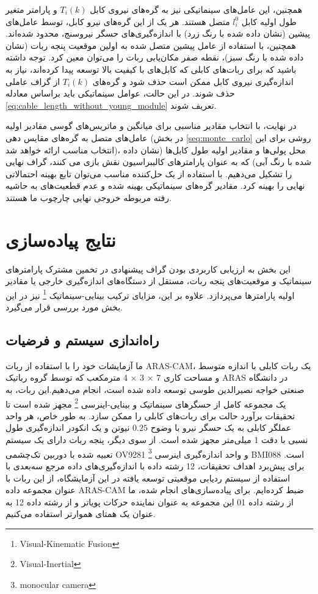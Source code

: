 همچنین، این عامل‌های سینماتیکی نیز به گره‌های نیروی کابل
$T_i(k)$
و پارامتر متغیر طول اولیه کابل
$l_{i}^0$
 متصل هستند. هر یک از این گره‌های نیرو کابل، توسط عامل‌های پیشین (نشان داده شده با رنگ زرد) با اندازه‌گیری‌های حسگر نیروسنج، محدود شده‌اند. همچنین، با استفاده از عامل پیشین متصل شده به اولین موقعیت پنجه ربات (نشان داده شده با رنگ سبز)، نقطه صفر مکان‌یابی ربات را می‌توان معین کرد. توجه داشته باشید که برای ربات‌های کابلی که کابل‌های با کیفیت بالا توسعه پیدا کرده‌اند، نیاز به اندازه‌گیری نیروی کابل ممکن است حذف شود و گره‌های
$T_i(k)$
از گراف عاملی حذف شوند. در این حالت، عوامل سینماتیکی باید براساس معادله
\ref{eq:cable_length_without_young_module}
تعریف شوند. 

در نهایت، با انتخاب مقادیر مناسبی برای میانگین و ماتریس‌های گوسی مقادیر اولیه عامل‌های متصل به گره‌های مقایس دهی (در بخش 
\ref{seq:monte_carlo}
روشی برای این انتخاب مناسب ارائه خواهد شد)، محل پولی‌ها و مقادیر اولیه طول کابل‌ها (نشان‌ داده شده با رنگ آبی) که به عنوان پارامترهای کالیبراسیون نقش بازی می کنند، گراف نهایی را تشکیل می‌دهیم. با استفاده از یک حل‌کننده مناسب می‌توان تابع بهینه‌ احتمالاتی نهایی را بهینه کرد. مقادیر گره‌های سینماتیکی بهینه شده و عدم قطعیت‌های به حاشیه رفته مربوطه خروجی نهایی چارچوب ما هستند.

\section{نتایج پیاده‌سازی}
این بخش به ارزیابی کاربردی بودن گراف پیشنهادی در تخمین مشترک پارامترهای سینماتیک و موقعیت‌های پنجه ربات، مستقل از دستگاه‌های اندازه‌گیری خارجی یا مقادیر اولیه پارامترها می‌پردازد. علاوه بر این، مزایای ترکیب بینایی-سینماتیک
\footnote{Visual-Kinematic Fusion}
 نیز در این بخش مورد بررسی قرار می‌گیرد.

\subsection{راه‌اندازی سیستم و فرضیات}
ما آزمایشات خود را با استفاده از ربات ARAS-CAM، یک ربات کابلی با اندازه متوسط و مساحت کاری 7 × 3 × 4 مترمکعب که توسط گروه رباتیک ARAS در دانشگاه صنعتی خواجه نصیرالدین طوسی توسعه داده شده است، انجام می‌دهیم.این ربات، به یک مجموعه کامل از حسگرهای سینماتیک و بینایی-اینرسی
\footnote{Visual-Inertial}
 مجهز شده است تا تحقیقات برآورد حالت برای ربات‌های کابلی را ممکن سازد. به طور خاص، هر واحد عملگر کابلی به یک حسگر نیرو با وضوح 
 $0.25$
  نیوتن و یک انکودر اندازه‌گیری طول نسبی با دقت 1 میلی‌متر مجهز شده است. از سوی دیگر، پنجه ربات دارای یک سیستم تعبیه شده با دوربین تک‌چشمی OV9281 
 \footnote{monocular camera}
 و واحد اندازه‌گیری اینرسی BMI088 است. برای پیش‌برد اهداف تحقیقات، 12 رشته داده با اندازه‌گیری‌های داده مرجع سه‌بعدی با استفاده از سیستم ردیابی موقعیتی توسعه یافته در این آزمایشگاه، از این ربات با عنوان مجموعه داده ARAS-CAM ضبط کرده‌ایم. برای پیاده‌سازی‌های انجام شده، ما از رشته داده 01 این مجموعه به عنوان نماینده حرکات پویاتر و از رشته داده 12 به عنوان یک همتای هموارتر استفاده می‌کنیم.


